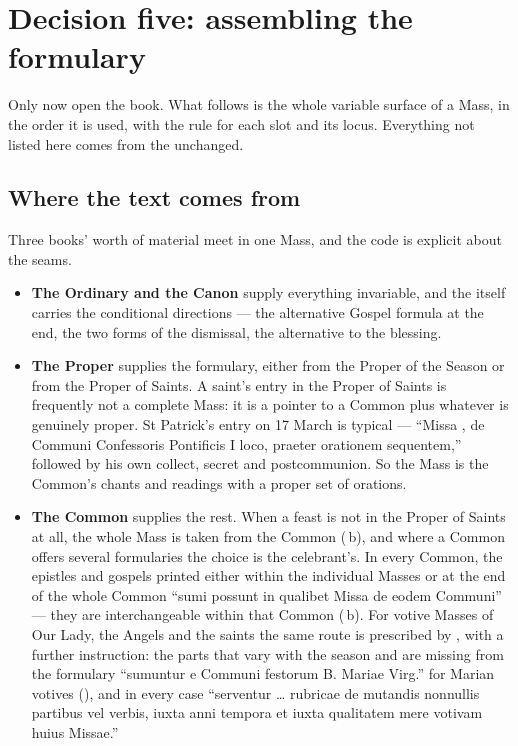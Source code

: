 \section{Decision five: assembling the formulary}

Only now open the book. What follows is the whole variable surface of a Mass,
in the order it is used, with the rule for each slot and its locus. Everything
not listed here comes from the  unchanged.

\subsection{Where the text comes from}

Three books' worth of material meet in one Mass, and the code is explicit
about the seams.

\begin{itemize}
\item \textbf{The Ordinary and the Canon} supply everything invariable, and
the  itself carries the conditional directions --- the
alternative Gospel formula at the end, the two forms of the dismissal, the
alternative to the blessing.

\item \textbf{The Proper} supplies the formulary, either from the Proper of
the Season or from the Proper of Saints. A saint's entry in the Proper of
Saints is frequently not a complete Mass: it is a pointer to a Common plus
whatever is genuinely proper. St Patrick's entry on 17 March is typical ---
``Missa , de Communi Confessoris Pontificis I loco, praeter
orationem sequentem,'' followed by his own collect, secret and postcommunion.
So the Mass is the Common's chants and readings with a proper set of orations.

\item \textbf{The Common} supplies the rest. When a feast is not in the Proper
of Saints at all, the whole Mass is taken from the Common (\,b), and
where a Common offers several formularies the choice is the celebrant's. In
every Common, the epistles and gospels printed either within the individual
Masses or at the end of the whole Common ``sumi possunt in qualibet Missa de
eodem Communi'' --- they are interchangeable within that Common
(\,b). For votive Masses of Our Lady, the Angels and the saints the
same route is prescribed by , with a further instruction:
the parts that vary with the season and are missing from the formulary
``sumuntur e Communi festorum B. Mariae Virg.'' for Marian votives
(), and in every case ``serventur \dots{} rubricae de mutandis
nonnullis partibus vel verbis, iuxta anni tempora et iuxta qualitatem mere
votivam huius Missae.''
\end{itemize}

